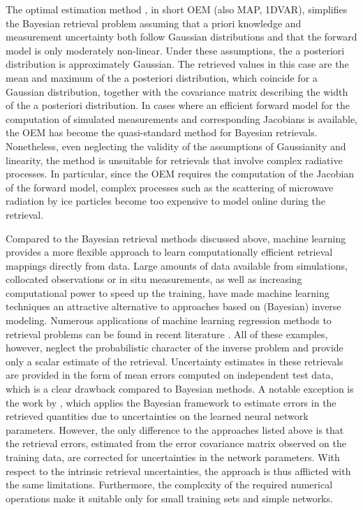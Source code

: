 \documentclass[journal abbreviation, manuscript]{copernicus}
\begin{document}
The optimal estimation method \citep{rodgers}, in short OEM (also MAP, 1DVAR),
simplifies the Bayesian retrieval problem assuming that a priori knowledge and
measurement uncertainty both follow Gaussian distributions and that the forward
model is only moderately non-linear. Under these assumptions, the a posteriori
distribution is approximately Gaussian. The retrieved values in this case are the mean
and maximum of the a posteriori distribution, which coincide for a Gaussian
distribution, together with the covariance matrix describing the width of the a
posteriori distribution. In cases where an efficient forward model for the
computation of simulated measurements and corresponding Jacobians is available,
the OEM has become the quasi-standard method for Bayesian retrievals.
Nonetheless, even neglecting the validity of the assumptions of Gaussianity and
linearity, the method is unsuitable for retrievals that involve complex
radiative processes. In particular, since the OEM requires the computation of the
Jacobian of the forward model, complex processes such as the scattering of
microwave radiation by ice particles become too expensive to model online during
the retrieval.

Compared to the Bayesian retrieval methods discussed above, machine learning
provides a more flexible approach to learn computationally efficient retrieval
mappings directly from data. Large amounts of data available from simulations,
collocated observations or in situ measurements, as well as increasing computational
power to speed up the training, have made machine learning techniques
an attractive alternative to approaches based on (Bayesian) inverse modeling.
Numerous applications of machine learning regression methods to retrieval
problems can be found in recent literature \citep{jimenez, holl, strandgren, wang, hakansson, brath}.
All of these examples, however, neglect the probabilistic character of the
inverse problem and provide only a scalar estimate of the retrieval. Uncertainty
estimates in these retrievals are provided in the form of mean errors computed
on independent test data, which is a clear drawback compared to Bayesian
methods. A notable exception is the work by \citet{aires_1, aires_2, aires_3},
which applies the Bayesian framework to estimate errors in the retrieved
quantities due to uncertainties on the learned neural network parameters.
However, the only difference to the approaches listed above is that the
retrieval errors, estimated from the error covariance matrix observed on the
training data, are corrected for uncertainties in the network parameters. With
respect to the intrinsic retrieval uncertainties, the approach is thus afflicted
with the same limitations. Furthermore, the complexity of the required numerical
operations make it suitable only for small training sets and simple networks.
\end{document}

